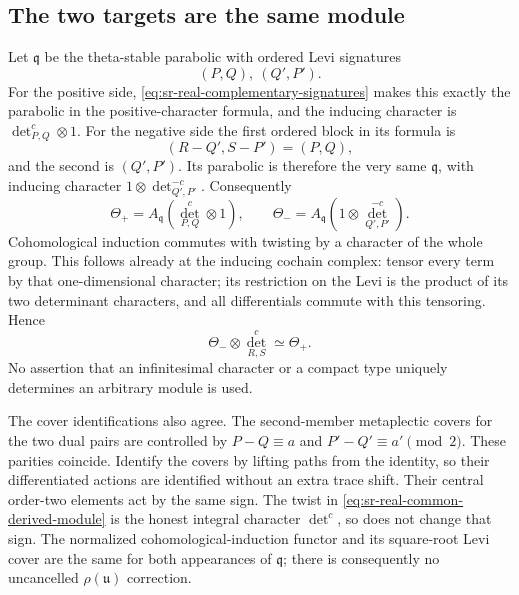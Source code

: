 \subsection{The two targets are the same module}
Let \(\mathfrak q\) be the theta-stable parabolic with ordered
Levi signatures
\[
                 (P,Q),\ (Q',P').
\]
For the positive side, \eqref{eq:sr-real-complementary-signatures}
makes this exactly the parabolic in the positive-character
formula, and the inducing character is
\(\det_{P,Q}^c\otimes1\).
For the negative side the first ordered block in its formula
is
\[
          (R-Q',S-P')=(P,Q),
\]
and the second is \((Q',P')\). Its parabolic is therefore
the very same \(\mathfrak q\), with inducing character
\(1\otimes\det_{Q',P'}^{-c}\).
Consequently
\[
 \Theta_+=A_{\mathfrak q}(\det_{P,Q}^c\otimes1),
 \qquad
 \Theta_-=A_{\mathfrak q}(1\otimes\det_{Q',P'}^{-c}).
\]
Cohomological induction commutes with twisting by a character
of the whole group. This follows already at the inducing
cochain complex: tensor every term by that one-dimensional
character; its restriction on the Levi is the product of
its two determinant characters, and all differentials
commute with this tensoring.
Hence
\begin{equation}\label{eq:sr-real-common-derived-module}
                   \Theta_-\otimes\det_{R,S}^c
                                     \simeq\Theta_+ .
\end{equation}
No assertion that an infinitesimal character or a compact
type uniquely determines an arbitrary module is used.

The cover identifications also agree. The second-member
metaplectic covers for the two dual pairs are controlled
by \(P-Q\equiv a\) and \(P'-Q'\equiv a'\pmod2\).
These parities coincide. Identify the covers by lifting
paths from the identity, so their differentiated actions
are identified without an extra trace shift.
Their central order-two elements act by the same sign.
The twist in \eqref{eq:sr-real-common-derived-module} is
the honest integral character \(\det^c\), so does not
change that sign. The normalized cohomological-induction
functor and its square-root Levi cover are the same for
both appearances of \(\mathfrak q\); there is consequently
no uncancelled \(\rho(\mathfrak u)\) correction.


